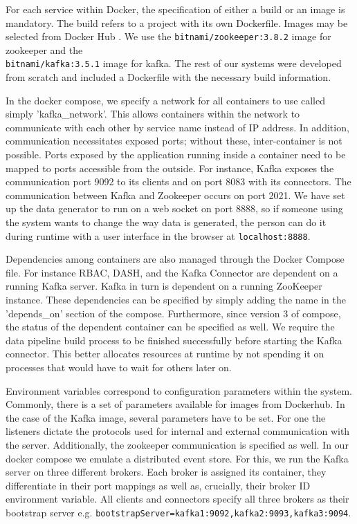 For each service within Docker, the specification of either a build or an image is mandatory. The build refers to a project with its own Dockerfile. Images may be selected from Docker Hub \cite{dockerhub}. We use the \texttt{bitnami/zookeeper:3.8.2} image for zookeeper and the \\ \texttt{bitnami/kafka:3.5.1} image for kafka. The rest of our systems were developed from scratch and included a Dockerfile with the necessary build information. \par
In the docker compose, we specify a network for all containers to use called simply 'kafka\_network'. This allows containers within the network to communicate with each other by service name instead of IP address. In addition, communication necessitates exposed ports; without these, inter-container is not possible. Ports exposed by the application running inside a container need to be mapped to ports accessible from the outside. For instance, Kafka exposes the communication port 9092 to its clients and on port 8083 with its connectors. The communication between Kafka and Zookeeper occurs on port 2021. We have set up the data generator to run on a web socket on port 8888, so if someone using the system wants to change the way data is generated, the person can do it during runtime with a user interface in the browser at \texttt{localhost:8888}. \par
Dependencies among containers are also managed through the Docker Compose file. For instance \ac{RBAC}, \ac{DASH}, and the Kafka Connector are dependent on a running Kafka server. Kafka in turn is dependent on a running ZooKeeper instance. These dependencies can be specified by simply adding the name in the 'depends\_on' section of the compose. Furthermore, since version 3 of compose, the status of the dependent container can be specified as well. We require the data pipeline build process to be finished successfully before starting the Kafka connector. This better allocates resources at runtime by not spending it on processes that would have to wait for others later on. \par
Environment variables correspond to configuration parameters within the system. Commonly, there is a set of parameters available for images from Dockerhub. In the case of the Kafka image, several parameters have to be set. For one the listeners dictate the protocols used for internal and external communication with the server. Additionally, the zookeeper communication is specified as well. In our docker compose we emulate a distributed event store. For this, we run the Kafka server on three different brokers. Each broker is assigned its container, they differentiate in their port mappings as well as, crucially, their broker ID environment variable. All clients and connectors specify all three brokers as their bootstrap server e.g. \texttt{bootstrapServer=kafka1:9092,kafka2:9093,kafka3:9094}. \par
